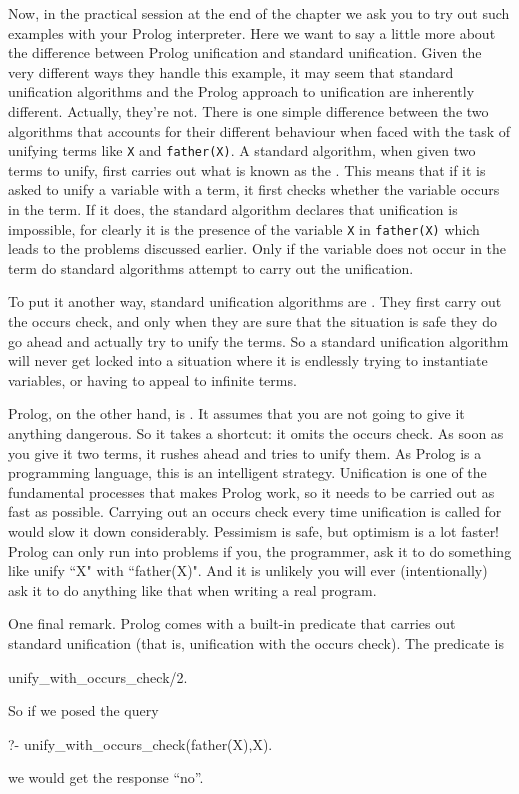 Now, in the practical session at the end of the chapter we ask you to
try out such examples with your Prolog interpreter. Here we want to
say a little more about the difference between Prolog unification and
standard unification.  Given the very different ways they handle this
example, it may seem that standard unification algorithms and the
Prolog approach to unification are inherently different. Actually,
they're not. There is one simple difference between the two algorithms
that accounts for their different behaviour when faced with the task
of unifying terms like \texttt{X} and \texttt{father(X)}.  A standard
algorithm, when given two terms to unify, first carries out what is
known as the .  This means that if it is asked to
unify a variable with a term, it first checks whether the variable
occurs in the term.  If it does, the standard algorithm declares that
unification is impossible, for  clearly it is the presence of the variable
\texttt{X} in  \texttt{father(X)} which leads to the problems
discussed earlier.  Only if the variable does not occur in the term do
standard algorithms attempt to carry out the unification.


To put it another way, standard unification algorithms are
.  They first carry out the occurs check, and
only when they are sure that the situation is safe they do go ahead
and actually try to unify the terms. So a standard unification
algorithm will never get locked into a situation where it is endlessly
trying to instantiate variables, or having to appeal to infinite
terms.

Prolog, on the other hand, is . It assumes that
you are not going to give it anything dangerous.  So it takes a
shortcut: it omits the occurs check. As soon as you give it two terms,
it rushes ahead and tries to unify them.  As Prolog is a programming
language, this is an intelligent strategy.  Unification is one of the
fundamental processes that makes Prolog work, so it needs to be
carried out as fast as possible. Carrying out an occurs check every
time unification is called for would slow it down
considerably. Pessimism is safe, but optimism is a lot faster!  Prolog
can only run into problems if you, the programmer, ask it to do
something like unify ``X" with ``father(X)". And it is unlikely you will
ever (intentionally) ask it to do anything like that when writing a
real program.


One final remark.  Prolog comes with a built-in predicate that carries
out standard unification (that is, unification with the occurs
check). The predicate is
\begin{LPNcodedisplay}
unify_with_occurs_check/2.
\end{LPNcodedisplay}
So if we posed the query
\begin{LPNcodedisplay}
?- unify_with_occurs_check(father(X),X).
\end{LPNcodedisplay}
we would get the response ``no''.


